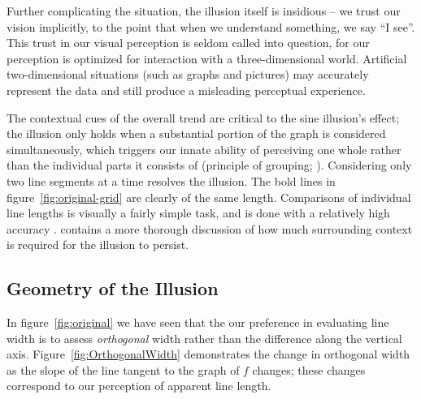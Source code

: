\documentclass[11pt]{isuthesis}\usepackage[]{graphicx}\usepackage[]{color}
\begin{document}
Further complicating the situation, the illusion itself is insidious -- we trust our vision implicitly, to the point that when we understand something, we say ``I see''. This trust in our visual perception is seldom called into question, for our perception is optimized for interaction with a three-dimensional world. Artificial two-dimensional situations (such as graphs and pictures) may accurately represent the data and still produce a misleading perceptual experience.

The contextual cues of the overall trend are critical to the sine illusion's effect;  the illusion  only  holds when a substantial portion of the graph is considered simultaneously, which triggers our innate ability of perceiving one whole rather than the individual parts it consists of (principle of grouping; \citet{wolfe2012sensation}).
Considering only two line segments at a time resolves the illusion. The bold lines in figure~\ref{fig:original-grid} are clearly of the same length.  Comparisons of individual line lengths is visually a fairly simple task, and is done with a relatively high accuracy \citep{cleveland:1984}. 
\citet{day:1991} contains a more thorough discussion of how much surrounding context is required for the illusion to persist. 

\subsection{Geometry of the Illusion}\hfill\newline
In figure~\ref{fig:original} we have seen that the our preference in evaluating line width is to assess {\it orthogonal} width rather than the difference along the vertical axis. 
Figure~\ref{fig:OrthogonalWidth} demonstrates the change in orthogonal width as the slope of the line tangent to the graph of $f$ changes; these changes correspond to our perception of apparent line length. 
\end{document}
